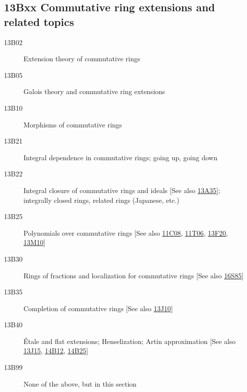 \subsection*{13Bxx Commutative ring extensions and related topics }\label{13Bxx}
\begin{description}          
\item [13B02]\label{13B02} Extension theory of commutative rings
\item [13B05]\label{13B05} Galois theory and commutative ring extensions
\item [13B10]\label{13B10} Morphisms of commutative rings
\item [13B21]\label{13B21} Integral dependence in commutative rings; going up, going down
\item [13B22]\label{13B22} Integral closure of commutative rings and ideals [See also \hyperref[13A35]{13A35}]; integrally closed rings, related rings (Japanese, etc.)
\item [13B25]\label{13B25} Polynomials over commutative rings [See also \hyperref[11C08]{11C08}, \hyperref[11T06]{11T06}, \hyperref[13F20]{13F20}, \hyperref[13M10]{13M10}]
\item [13B30]\label{13B30} Rings of fractions and localization for commutative rings [See also \hyperref[16S85]{16S85}]
\item [13B35]\label{13B35} Completion of commutative rings [See also \hyperref[13J10]{13J10}]
\item [13B40]\label{13B40} \'{E}tale and flat extensions; Henselization; Artin approximation [See also \hyperref[13J15]{13J15}, \hyperref[14B12]{14B12}, \hyperref[14B25]{14B25}]
\item [13B99]\label{13B99} None of the above, but in this section
\end{description}          
